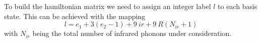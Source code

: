 To build the hamiltonian matrix we need to assign an integer label $l$ to each basis state. 
This can be achieved with the mapping
%
\begin{equation}
  \label{eq:label}
  l = e_1 + 3(e_2 - 1) + 9\ ir + 9\ R (N_{ir} +1)
\end{equation}
%
with $N_{ir}$ being the total number of infrared phonons under consideration.

